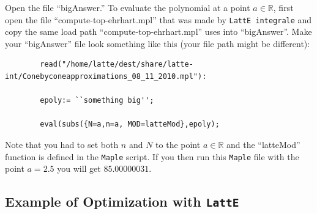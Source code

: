 \documentclass{article}
\newcommand{\R}{{\mathbb R}}
\newcommand{\latte}{{\tt LattE}\xspace}
\newcommand{\latteInt}{{\tt LattE integrale}\xspace}
\newcommand{\maple}{{\tt Maple}\xspace}
\begin{document}
Open the file ``bigAnswer.'' To evaluate the polynomial at a point $a \in \R$, first open the file ``compute-top-ehrhart.mpl'' that was made by \latteInt and copy the same load path ``compute-top-ehrhart.mpl'' uses into ``bigAnswer''. Make your ``bigAnswer'' file look something like this (your file path might be different):

        \begin{verbatim}
        read("/home/latte/dest/share/latte-int/Conebyconeapproximations_08_11_2010.mpl"):
        
        epoly:= ``something big'';
        
        eval(subs({N=a,n=a, MOD=latteMod},epoly);
        \end{verbatim}
Note that you had to set both $n$ and $N$ to the point $a \in \R$ and the ``latteMod'' function is defined in the \maple script. If you then run this \maple file with the point $a=2.5$ you will get $85.00000031$.

\subsection{Example of Optimization with \latte}
\end{document}

